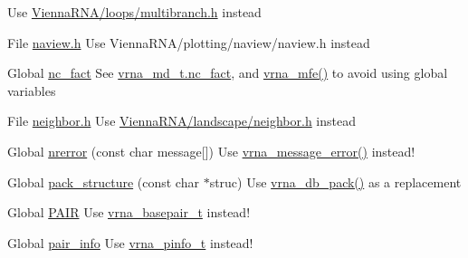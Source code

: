 \begin{DoxyRefList}
%
Use \mbox{\hyperlink{multibranch_8h}{Vienna\+RNA/loops/multibranch.\+h}} instead  
\item[File \mbox{\hyperlink{naview_8h}{naview.h}} ]\label{deprecated__deprecated000094}%
%
Use Vienna\+RNA/plotting/naview/naview.\+h instead  
\item[Global \mbox{\hyperlink{alifold_8h_a502948a122a2af5b914355b1f3ea2f61}{nc\+\_\+fact}} ]\label{deprecated__deprecated000017}%
%
See \mbox{\hyperlink{group__model__details_abcf568e6124bfcb2f847ff4eb0dfded6}{vrna\+\_\+md\+\_\+t.\+nc\+\_\+fact}}, and \mbox{\hyperlink{group__mfe__global_gabd3b147371ccf25c577f88bbbaf159fd}{vrna\+\_\+mfe()}} to avoid using global variables 
\item[File \mbox{\hyperlink{neighbor_8h}{neighbor.h}} ]\label{deprecated__deprecated000095}%
%
Use \mbox{\hyperlink{landscape_2neighbor_8h}{Vienna\+RNA/landscape/neighbor.\+h}} instead  
\item[Global \mbox{\hyperlink{utils_2basic_8h_a127ce946e56b5a5773781cabe68e38c5}{nrerror}} (const char message\mbox{[}\mbox{]})]\label{deprecated__deprecated000186}%
%
Use \mbox{\hyperlink{group__message__utils_ga36b35be01d7f36cf7f59c245eee628d1}{vrna\+\_\+message\+\_\+error()}} instead!  
\item[Global \mbox{\hyperlink{group__struct__utils__deprecated_ga99e8565f0e7eb7c59a100841d50d7ee5}{pack\+\_\+structure}} (const char $\ast$struc)]\label{deprecated__deprecated000200}%
%
Use \mbox{\hyperlink{group__struct__utils__dot__bracket_ga9db9613100e9f750017d3e13a874bb7d}{vrna\+\_\+db\+\_\+pack()}} as a replacement


\item[Global \mbox{\hyperlink{group__data__structures_ga4381025ffbd692e54189b2c679c79c99}{PAIR}} ]\label{deprecated__deprecated000214}%
%
Use \mbox{\hyperlink{group__data__structures_gac8c5669d3fb813cacf506489689305ce}{vrna\+\_\+basepair\+\_\+t}} instead!  
\item[Global \mbox{\hyperlink{group__aln__utils__deprecated_ga7b61662a793ad0aa1ea38efc3a5baacc}{pair\+\_\+info}} ]\label{deprecated__deprecated000180}%
%
Use \mbox{\hyperlink{group__aln__utils_ga6660dfca23debee7306e0cd53341263f}{vrna\+\_\+pinfo\+\_\+t}} instead!



\end{DoxyRefList}
